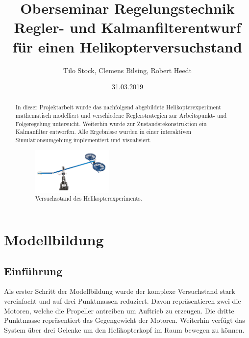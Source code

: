\documentclass[10pt,twocolumn]{article}
\begin{document}
	\fontsize{10}{11}\selectfont
	\title{Oberseminar Regelungstechnik \\ Regler- und Kalmanfilterentwurf f\"ur einen 					Helikopterversuchstand}
	\author{Tilo Stock, Clemens Bilsing, Robert Heedt}
	\date {31.03.2019}
	
	\maketitle
	\thispagestyle{empty}
	
	\renewcommand\abstractname{Zusammenfassung}
	\begin{abstract}
		In dieser Projektarbeit wurde das nachfolgend abgebildete Helikopterexperiment mathematisch modelliert und verschiedene Reglerstrategien zur Arbeitspunkt- und Folgeregelung untersucht.
		Weiterhin wurde zur Zustandsrekonstruktion ein Kalmanfilter entworfen. Alle Ergebnisse wurden in einer interaktiven Simulationsumgebung implementiert und visualisiert.
		
		\begin{figure}[ht]
			\centering
			\includegraphics[width=0.4\textwidth]{images/Versuchstand}
			\caption{Versuchsstand des Helikopterexperiments.}
			\label{Versuchstand}
		\end{figure}
	\end{abstract}
	
	\section{Modellbildung}
	\subsection{Einführung}
	
	Als erster Schritt der Modellbildung wurde der komplexe Versuchstand stark vereinfacht und auf drei Punktmassen reduziert. Davon repräsentieren zwei die Motoren, welche die Propeller antreiben um Auftrieb zu erzeugen. Die dritte Punktmasse repräsentiert das Gegengewicht der Motoren. Weiterhin verfügt das System über drei Gelenke um den Helikopterkopf im Raum bewegen zu können.
	
\end{document}
